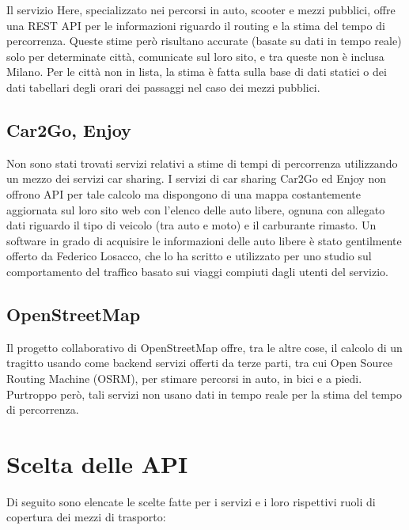 Il servizio Here, specializzato nei percorsi in auto, scooter e mezzi pubblici, offre una REST API per le informazioni riguardo il routing e la stima del tempo di percorrenza. Queste stime però risultano accurate (basate su dati in tempo reale) solo per determinate città, comunicate sul loro sito, e tra queste non è inclusa Milano. Per le città non in lista, la stima è fatta sulla base di dati statici o dei dati tabellari degli orari dei passaggi nel caso dei mezzi pubblici\cite{hereapi}.

\subsection{Car2Go, Enjoy}

Non sono stati trovati servizi relativi a stime di tempi di percorrenza utilizzando un mezzo dei servizi car sharing. I servizi di car sharing Car2Go ed Enjoy non offrono API per tale calcolo ma dispongono di una mappa costantemente aggiornata sul loro sito web con l'elenco delle auto libere, ognuna con allegato dati riguardo il tipo di veicolo (tra auto e moto) e il carburante rimasto. Un software in grado di acquisire le informazioni delle auto libere è stato gentilmente offerto da Federico Losacco, che lo ha scritto e utilizzato per uno studio sul comportamento del traffico basato sui viaggi compiuti dagli utenti del servizio\cite{losaccofederico}.

\subsection{OpenStreetMap}

Il progetto collaborativo di OpenStreetMap offre, tra le altre cose, il calcolo di un tragitto usando come backend servizi offerti da terze parti, tra cui Open Source Routing Machine (OSRM), per stimare percorsi in auto, in bici e a piedi. Purtroppo però, tali servizi non usano dati in tempo reale per la stima del tempo di percorrenza\cite{osm}.

\section{Scelta delle API}

Di seguito sono elencate le scelte fatte per i servizi e i loro rispettivi ruoli di copertura dei mezzi di trasporto:


